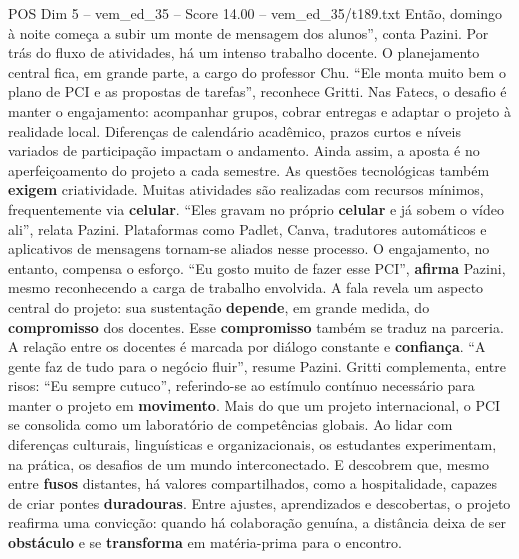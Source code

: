 \begin{textsample}{POS Dim 5 – vem\_ed\_35 – Score 14.00 – vem\_ed\_35/t189.txt}
Então, domingo à noite começa a subir um monte de mensagem dos alunos”, conta Pazini.
Por trás do fluxo de atividades, há um intenso trabalho docente.
O planejamento central fica, em grande parte, a cargo do professor Chu. “Ele monta muito bem o plano de PCI e as propostas de tarefas”, reconhece Gritti.
Nas Fatecs, o desafio é manter o engajamento: acompanhar grupos, cobrar entregas e adaptar o projeto à realidade local.
Diferenças de calendário acadêmico, prazos curtos e níveis variados de participação impactam o andamento.
Ainda assim, a aposta é no aperfeiçoamento do projeto a cada semestre.
As questões tecnológicas também \textbf{exigem} criatividade.
Muitas atividades são realizadas com recursos mínimos, frequentemente via \textbf{celular}. “Eles gravam no próprio \textbf{celular} e já sobem o vídeo ali”, relata Pazini.
Plataformas como Padlet, Canva, tradutores automáticos e aplicativos de mensagens tornam-se aliados nesse processo.
O engajamento, no entanto, compensa o esforço. “Eu gosto muito de fazer esse PCI”, \textbf{afirma} Pazini, mesmo reconhecendo a carga de trabalho envolvida.
A fala revela um aspecto central do projeto: sua sustentação \textbf{depende}, em grande medida, do \textbf{compromisso} dos docentes.
Esse \textbf{compromisso} também se traduz na parceria.
A relação entre os docentes é marcada por diálogo constante e \textbf{confiança}. “A gente faz de tudo para o negócio fluir”, resume Pazini.
Gritti complementa, entre risos: “Eu sempre cutuco”, referindo-se ao estímulo contínuo necessário para manter o projeto em \textbf{movimento}.
Mais do que um projeto internacional, o PCI se consolida como um laboratório de competências globais.
Ao lidar com diferenças culturais, linguísticas e organizacionais, os estudantes experimentam, na prática, os desafios de um mundo interconectado.
E descobrem que, mesmo entre \textbf{fusos} distantes, há valores compartilhados, como a hospitalidade, capazes de criar pontes \textbf{duradouras}.
Entre ajustes, aprendizados e descobertas, o projeto reafirma uma convicção: quando há colaboração genuína, a distância deixa de ser \textbf{obstáculo} e se \textbf{transforma} em matéria-prima para o encontro.

\end{textsample}
